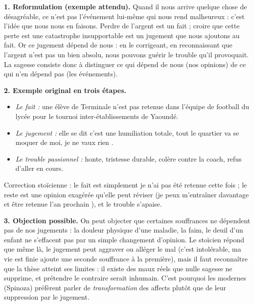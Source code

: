 \documentclass[11pt]{article}
\begin{document}
\begin{corrige}

\textbf{1. Reformulation (exemple attendu).} Quand il nous arrive quelque chose de désagréable, ce n'est pas l'événement lui-même qui nous rend malheureux : c'est l'idée que nous nous en faisons. Perdre de l'argent est un fait ; croire que cette perte est une catastrophe insupportable est un jugement que nous ajoutons au fait. Or ce jugement dépend de nous : en le corrigeant, en reconnaissant que l'argent n'est pas un bien absolu, nous pouvons guérir le trouble qu'il provoquait. La sagesse consiste donc à distinguer ce qui dépend de nous (nos opinions) de ce qui n'en dépend pas (les événements).

\textbf{2. Exemple original en trois étapes.}
\begin{itemize}
\item \emph{Le fait :} une élève de Terminale n'est pas retenue dans l'équipe de football du lycée pour le tournoi inter-établissements de Yaoundé.
\item \emph{Le jugement :} elle se dit \guillemotleft c'est une humiliation totale, tout le quartier va se moquer de moi, je ne vaux rien \guillemotright.
\item \emph{Le trouble passionnel :} honte, tristesse durable, colère contre la coach, refus d'aller en cours.
\end{itemize}
Correction stoïcienne : le fait est simplement \guillemotleft je n'ai pas été retenue cette fois \guillemotright{} ; le reste est une opinion exagérée qu'elle peut réviser (\guillemotleft je peux m'entraîner davantage et être retenue l'an prochain \guillemotright), et le trouble s'apaise.

\textbf{3. Objection possible.} On peut objecter que certaines souffrances ne dépendent pas de nos jugements : la douleur physique d'une maladie, la faim, le deuil d'un enfant ne s'effacent pas par un simple changement d'opinion. Le stoïcien répond que même là, le jugement peut aggraver ou alléger le mal (\guillemotleft c'est intolérable, ma vie est finie \guillemotright{} ajoute une seconde souffrance à la première), mais il faut reconnaître que la thèse atteint ses limites : il existe des maux réels que nulle sagesse ne supprime, et prétendre le contraire serait inhumain. C'est pourquoi les modernes (Spinoza) préfèrent parler de \emph{transformation} des affects plutôt que de leur suppression par le jugement.

\end{corrige}
\end{document}
